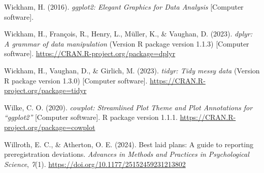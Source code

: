 \documentclass[authordate, meta, issue]{jote-new-article}
\begin{document}
	Wickham, H. (2016). \emph{ggplot2: Elegant Graphics for Data Analysis} [Computer software].



	Wickham, H., François, R., Henry, L., Müller, K., \& Vaughan, D. (2023). \emph{dplyr: A grammar of data manipulation} (Version R package version 1.1.3) [Computer software]. \url{https://CRAN.R-project.org/package=dplyr}



	Wickham, H., Vaughan, D., \& Girlich, M. (2023). \emph{tidyr: Tidy messy data} (Version R package version 1.3.0) [Computer software]. \url{https://CRAN.R-project.org/package=tidyr}



	Wilke, C. O. (2020). \emph{cowplot: Streamlined Plot Theme and Plot Annotations for “ggplot2”} [Computer software]. R package version 1.1.1. \url{https://CRAN.R-project.org/package=cowplot}



	Willroth, E. C., \& Atherton, O. E. (2024). Best laid plans: A guide to reporting preregistration deviations. \emph{Advances in Methods and Practices in Psychological Science}, \emph{7}(1). \url{https://doi.org/10.1177/25152459231213802}
\end{document}
